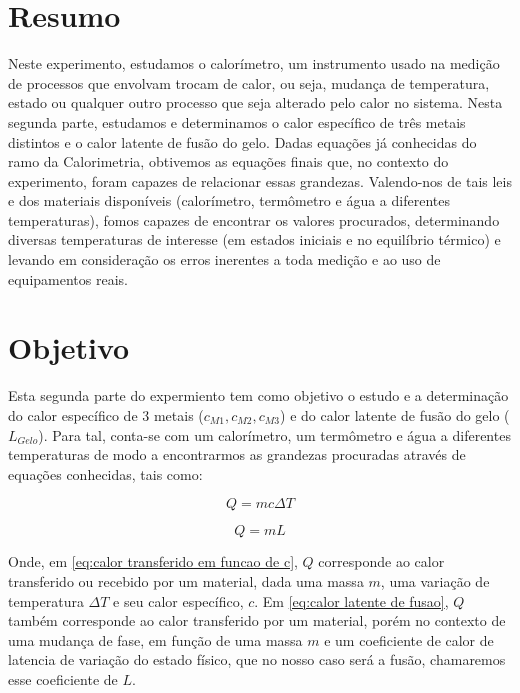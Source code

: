 \documentclass[a4paper]{article}
\begin{document}
	\section{Resumo}
		Neste experimento, estudamos o calorímetro, um instrumento usado na
		medição de processos que envolvam trocam de calor, ou seja, mudança
		de temperatura, estado ou qualquer outro processo que seja alterado
		pelo calor no sistema. Nesta segunda parte, estudamos e determinamos
		o calor específico de três metais distintos e o calor latente de fusão
		do gelo. Dadas equações já conhecidas do ramo da Calorimetria, obtivemos
		as equações finais que, no contexto do experimento, foram capazes
		de relacionar essas grandezas. Valendo-nos de tais leis e dos materiais
		disponíveis (calorímetro, termômetro e água a diferentes temperaturas),
		fomos capazes de encontrar os valores procurados, determinando diversas
		temperaturas de interesse (em estados iniciais e no equilíbrio térmico)
		e levando em consideração os erros inerentes a toda medição e ao uso
		de equipamentos reais.


	\section{Objetivo}
		Esta segunda parte do expermiento tem como objetivo o estudo e a determinação
		do calor específico de 3 metais ($c_{M1},c_{M2},c_{M3}$) e do calor
		latente de fusão do gelo ($L_{Gelo}$). Para tal, conta-se com um
		calorímetro, um termômetro e água a diferentes temperaturas de modo
		a encontrarmos as grandezas procuradas através de equações conhecidas,
		tais como:

		\begin{equation}
			Q=mc\Delta T\label{eq:calor transferido em funcao de c}
		\end{equation}


		\begin{equation}
			Q=mL\label{eq:calor latente de fusao}
		\end{equation}


		Onde, em \eqref{eq:calor transferido em funcao de c}, $Q$ corresponde
		ao calor transferido ou recebido por um material, dada uma massa $m$,
		uma variação de temperatura $\Delta T$ e seu calor específico, $c$.
		Em \eqref{eq:calor latente de fusao}, $Q$ também corresponde ao
		calor transferido por um material, porém no contexto de uma mudança
		de fase, em função de uma massa $m$ e um coeficiente de calor de
		latencia de variação do estado físico, que no nosso caso será a fusão,
		chamaremos esse coeficiente de $L$.
\end{document}

